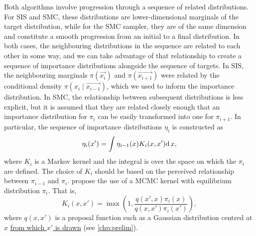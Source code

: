 Both algorithms involve progression through a sequence of related
distributions. For \gls{SIS} and \gls{SMC}, these distributions are
lower-dimensional marginals of the target distribution, while for the \gls{SMC}
sampler, they are of the same dimension and constitute a smooth progression
from an initial to a final distribution. In both cases, the neighbouring
distributions in the sequence are related to each other in some way, and we can
take advantage of that relationship to create a sequence of importance
distributions alongside the sequence of targets. In \gls{SIS}, the neighbouring
marginals $\pi(\vec{x_i})$ and $\pi(\vec{x_{i+1}})$ were related by the
conditional density $\pi(x_i \mid \vec{x_{i-1}})$, which we used to inform the
importance distribution. In \gls{SMC}, the relationship between subsequent
distributions is less explicit, but it is assumed that they are related closely
enough that an importance distribution for $\pi_i$ can be easily transformed
into one for $\pi_{i+1}$. In particular, the sequence of importance
distributions $\eta_i$ is constructed as
\begin{align}
  \label{eq:impint}
  \eta_i(x') = \int \eta_{i-1}(x) K_i(x, x') \mathrm{d}\, x,
\end{align}
where $K_i$ is a Markov kernel and the integral is over the space on which the
$\pi_i$ are defined. The choice of $K_i$ should be based on the perceived
relationship between $\pi_{i-1}$ and $\pi_i$. \textcite{del2006sequential}
propose the use of a \gls{MCMC} kernel with equilibrium distribution $\pi_i$.
That is,
\[
  K_i(x, x') = \max\left(1, \frac{q(x', x)\pi_i(x)}{q(x, x')\pi_i(x')}\right),
\]
where $q(x, x')$ is a proposal function such as a Gaussian distribution
centred at $x$ {\color{blue}\uline{from which $x'$ is drawn}} (see
\cref{chp:prelim}). 


